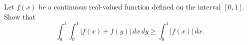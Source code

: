 Let  $f(x)$  be  a continuous real-valued function defined on the interval
$[0,1]$. Show that
\[
   \int_0^1 \int_0^1 | f(x) + f(y) |\,dx\,dy \geq \int_0^1 |f(x)|\,dx.
\]
